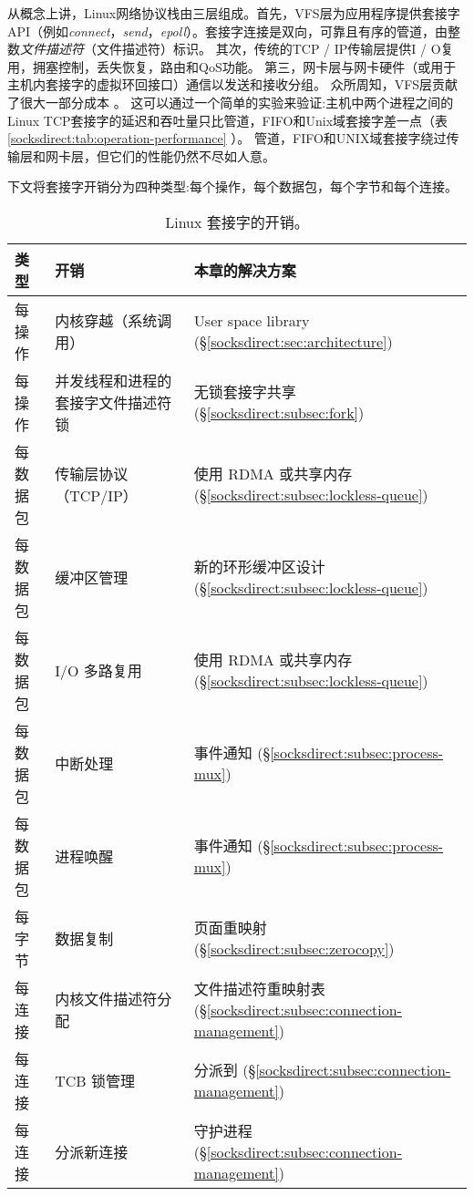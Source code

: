 从概念上讲，Linux网络协议栈由三层组成。首先，VFS层为应用程序提供套接字API（例如\emph {connect}，\emph {send}，\emph {epoll}）。套接字连接是双向，可靠且有序的管道，由整数\emph {文件描述符}（文件描述符）标识。
其次，传统的TCP / IP传输层提供I / O复用，拥塞控制，丢失恢复，路由和QoS功能。
第三，网卡层与网卡硬件（或用于主机内套接字的虚拟环回接口）通信以发送和接收分组。
众所周知，VFS层贡献了很大一部分成本 \cite {clark1989analysis,boyd2010analysis}。
这可以通过一个简单的实验来验证:主机中两个进程之间的Linux TCP套接字的延迟和吞吐量只比管道，FIFO和Unix域套接字差一点（表 \ref {socksdirect:tab:operation-performance} ）。
管道，FIFO和UNIX域套接字绕过传输层和网卡层，但它们的性能仍然不尽如人意。

下文将套接字开销分为四种类型:每个操作，每个数据包，每个字节和每个连接。


\begin{table}[t]
	\centering
	\caption{Linux 套接字的开销。}
	\label{socksdirect:tab:overhead}
	\small
		\begin{tabularx}{1\textwidth}{l|X|X}
			\hline
			类型 & 开销 & 本章的解决方案 \\
			\hline
			\hline
			每操作 & 内核穿越（系统调用） & User space library (\S\ref{socksdirect:sec:architecture}) \\
			\hline
			每操作 & 并发线程和进程的套接字文件描述符锁 & 无锁套接字共享 (\S\ref{socksdirect:subsec:fork}) \\
			\hline
			\hline
			每数据包 & 传输层协议（TCP/IP） & 使用 RDMA 或共享内存 (\S\ref{socksdirect:subsec:lockless-queue}) \\
			\hline
			每数据包 & 缓冲区管理 & 新的环形缓冲区设计 (\S\ref{socksdirect:subsec:lockless-queue}) \\
			\hline
			每数据包 & I/O 多路复用 & 使用 RDMA 或共享内存 (\S\ref{socksdirect:subsec:lockless-queue}) \\
			\hline
			每数据包 & 中断处理 & 事件通知 (\S\ref{socksdirect:subsec:process-mux}) \\
			\hline
			每数据包 & 进程唤醒 & 事件通知 (\S\ref{socksdirect:subsec:process-mux}) \\
			\hline
			\hline
			每字节 & 数据复制 & 页面重映射 (\S\ref{socksdirect:subsec:zerocopy}) \\
			\hline
			\hline
			每连接  & 内核文件描述符分配 & 文件描述符重映射表 (\S\ref{socksdirect:subsec:connection-management}) \\
			\hline
			每连接 & TCB 锁管理 & 分派到 \libipc{} (\S\ref{socksdirect:subsec:connection-management}) \\
			\hline
			每连接 & 分派新连接 & 守护进程 (\S\ref{socksdirect:subsec:connection-management}) \\
			\hline
		\end{tabularx}
\end{table}

